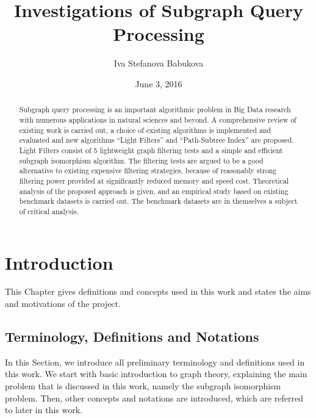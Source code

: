 \documentclass{l4proj}
\begin{document}
\title{Investigations of Subgraph Query Processing}
\author{Iva Stefanova Babukova}
\date{June 3, 2016}
\maketitle

\begin{abstract}

Subgraph query processing is an important algorithmic problem in Big Data research with numerous applications in natural sciences and beyond. A comprehensive review of existing work is carried out, a choice of existing algorithms is implemented and evaluated and new algorithms ``Light Filters'' and ``Path-Subtree Index'' are proposed. Light Filters consist of 5 lightweight graph filtering tests and a simple and efficient subgraph isomorphism algorithm. The filtering tests are argued to be a good alternative to existing expensive filtering strategies, because of reasonably strong filtering power provided at significantly reduced memory and speed cost. Theoretical analysis of the proposed approach is given, and an empirical study based on existing benchmark datasets is carried out. The benchmark datasets are in themselves a subject of critical analysis.

\end{abstract}

\educationalconsent
%
%
\tableofcontents
\chapter{Introduction}
\label{ch:introduction}

This Chapter gives definitions and concepts used in this work and states the aims and motivations of the project. 

\section{Terminology, Definitions and Notations}
\label{sec:theory}
In this Section, we introduce all preliminary terminology and definitions used in this work. We start with basic introduction to graph theory, explaining the main problem that is discussed in this work, namely the subgraph isomorphism problem. Then, other concepts and notations are introduced, which are referred to later in this work.
\end{document}

